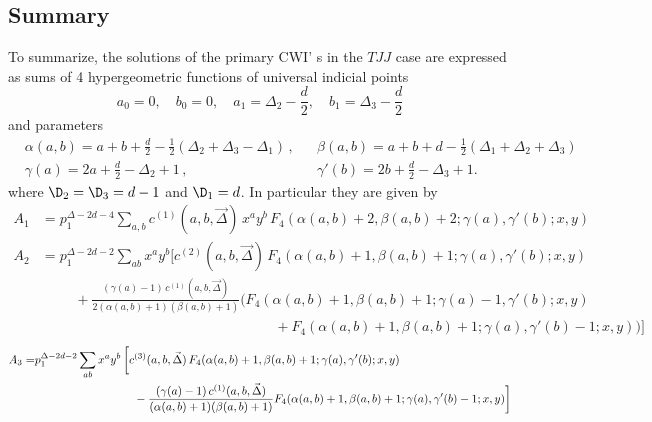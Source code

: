 \documentclass[a4paper,11pt,openright,twoside]{book}
\let\a=\alpha   \let\b=\beta   \let\g=\gamma   \let\d=\delta
\numberwithin{equation}{section}
\begin{document}
{{{\subsection{Summary}
\label{finfin}
To summarize, the solutions of the primary CWI' s in the $TJJ$ case are expressed as sums of 4 hypergeometric functions of universal indicial points 
\begin{equation}
	a_0 =0,\quad b_0=0,\quad a_1=\Delta_2- \frac{d}{2},\quad b_1=\Delta_3-\frac{d}{2}
\end{equation}
and parameters 
\begin{align}
	&\alpha(a,b)= a + b + \frac{d}{2} -\frac{1}{2}(\Delta_2 +\Delta_3 -\Delta_1)\,,  &&\beta (a,b)=a +  b + d -\frac{1}{2}(\Delta_1 +\Delta_2 +\Delta_3) \\
	&\gamma(a) =2 a +\frac{d}{2} -\Delta_2 + 1\,, &&\gamma'(b)=2 b +\frac{d}{2} -\Delta_3 + 1. \label{cons2}
\end{align}
where $\D_2=\D_3=d-1$ and $\D_1=d$. In particular they are given by
\begin{equation}
	\begin{split}
		A_1&=p_1^{\Delta-2 d - 4}\sum_{a,b} c^{(1)}(a,b,\vec{\Delta})\,x^a y^b \,F_4(\alpha(a,b) +2, \beta(a,b)+2; \gamma(a), \gamma'(b); x, y)
	\end{split}
\end{equation}
\begin{equation}
	\begin{split}
		A_2&= p_1^{\Delta-2 d - 2}\sum_{a b} x^a y^b\Bigg[c^{(2)}(a,b,\vec{\Delta})\,F_4(\alpha(a,b)+1, \beta(a,b)+1; \gamma(a), \gamma'(b); x, y)\\
		&\hspace{1cm}+ \frac{(\gamma(a)-1)\,c^{(1)}(a,b,\vec \Delta)}{2(\alpha(a,b)+1)(\beta(a,b)+1)}\bigg(F_4(\alpha(a,b) +1, \beta(a,b)+1; \gamma(a)-1, \gamma'(b); x, y)\\
		&\hspace{7cm}+ F_4(\alpha(a,b) +1, \beta(a,b)+1; \gamma(a), \gamma'(b)-1; x, y)\bigg)\Bigg]
	\end{split}
\end{equation}
\begin{align}
	A_3=&p_1^{\Delta-2 d -2} \sum_{a b} x^a y^b\,\bigg[c^{(3)}(a,b,\vec\Delta)\,F_4(\a(a,b)+1,\b(a,b)+1;\g(a),\g'(b);x,y)\notag\\
	&\hspace{3cm}-\frac{(\gamma(a)-1)\,c^{(1)}(a,b,\vec\Delta) }{(\alpha(a,b)+1)(\beta(a,b)+1)}F_4(\alpha(a,b)+1,\beta(a,b)+1; \gamma(a),\gamma'(b)-1;x,y)\bigg]

\end{align}}}}
\end{document}
